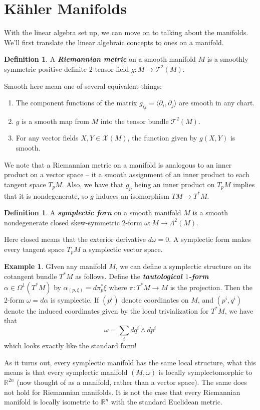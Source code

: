 \documentclass[psamsfonts]{amsart}
\theoremstyle{definition}
\newtheorem{defn}[thm]{Definition}
\newtheorem{exmp}[thm]{Example}
\theoremstyle{remark}
\newcommand{\R}{\mathbb{R}}
\newcommand{\ib}[1]{\textbf{\textit{#1}}}
\begin{document}
\section*{K\"ahler Manifolds}
%
With the linear algebra set up, we can move on to talking about the manifolds. We'll first translate the linear algebraic concepts to ones on a manifold.
%
\begin{defn}
A \ib{Riemannian metric} on a smooth manifold $M$ is a smoothly symmetric positive definite $2$-tensor field $g: M \to \mathcal{T}^2(M)$.
\end{defn}
Smooth here mean one of several equivalent things:
\begin{enumerate}
\item The component functions of the matrix $g_{ij} = \langle \partial_i, \partial_j \rangle$ are smooth in any chart.
\item $g$ is a smooth map from $M$ into the tensor bundle $\mathcal{T}^2(M)$.
\item For any vector fields $X,Y \in \mathcal{X}(M)$, the function given by $g(X,Y)$ is smooth.
\end{enumerate}
We note that a Riemannian metric on a manifold is analogous to an inner product on a vector space -- it a smooth assignment of an inner product to each tangent space $T_pM$. Also, we have that $g_p$ being an inner product on $T_pM$ implies that it is nondegenerate, so $g$ induces an isomorphism $TM \to T^*M$.
\begin{defn}
A \ib{symplectic forn} on a smooth manifold $M$ is a smooth nondegenerate closed skew-symmetric $2$-form $\omega: M \to \Lambda^2(M)$.
\end{defn}
Here closed means that the exterior derivative $d\omega = 0$. A symplectic form makes every tangent space $T_pM$ a symplectic vector space.
%
\begin{exmp}
GIven any manifold $M$, we can define a symplectic structure on its cotangent bundle $T^*M$ as follows. Define the \ib{tautological $1$-form} $\alpha \in \Omega^1(T^*M)$ by $\alpha_(p, \xi) = d\pi_p^*\xi$ where $\pi: T^*M \to M$ is the projection. Then the $2$-form $\omega = d\alpha$ is symplectic. If $(p^i)$ denote coordinates on $M$, and $(p^i,q^i)$ denote the induced coordinates given by the local trivialization for $T^*M$, we have that 
$$\omega = \sum_i dq^i \wedge dp^i $$
which looks exactly like the standard form!
\end{exmp}
%
As it turns out, every symplectic manifold has the same local structure, what this means is that every symplectic manifold $(M,\omega)$ is locally symplectomorphic to $\R^{2n}$ (now thought of as a manifold, rather than a vector space). The same does not hold for Riemannian manifolds. It is not the case that every Riemannian manifold is locally isometric to $\R^n$ with the standard Euclidean metric. 
\end{document}

